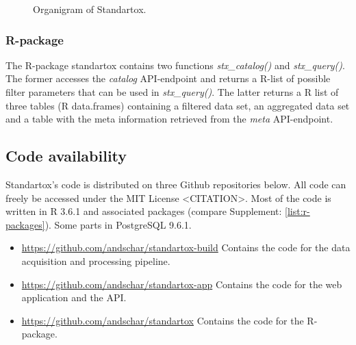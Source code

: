 \begin{figure}
    
    \caption{Organigram of Standartox.}
    \label{fig:stx-organigram}
\end{figure}


\subsubsection*{R-package}
The R-package standartox contains two functions \textit{stx\_catalog()} and \textit{stx\_query()}. The former accesses the \textit{catalog} API-endpoint and returns a R-list of possible filter parameters that can be used in \textit{stx\_query()}. The latter returns a R list of three tables (R data.frames) containing a filtered data set, an aggregated data set and a table with the meta information retrieved from the \textit{meta} API-endpoint.

\subsection*{Code availability}

Standartox's code is distributed on three Github repositories below. All code can freely be accessed under the MIT License <CITATION>. Most of the code is written in R 3.6.1 and associated packages (compare Supplement: \ref{list:r-packages}). Some parts in PostgreSQL 9.6.1.

\begin{itemize}

\item \url{https://github.com/andschar/standartox-build} \newline
Contains the code for the data acquisition and processing pipeline.

\item \url{https://github.com/andschar/standartox-app} \newline
Contains the code for the web application and the API.

\item \url{https://github.com/andschar/standartox} \newline
Contains the code for the R-package.

\end{itemize}




